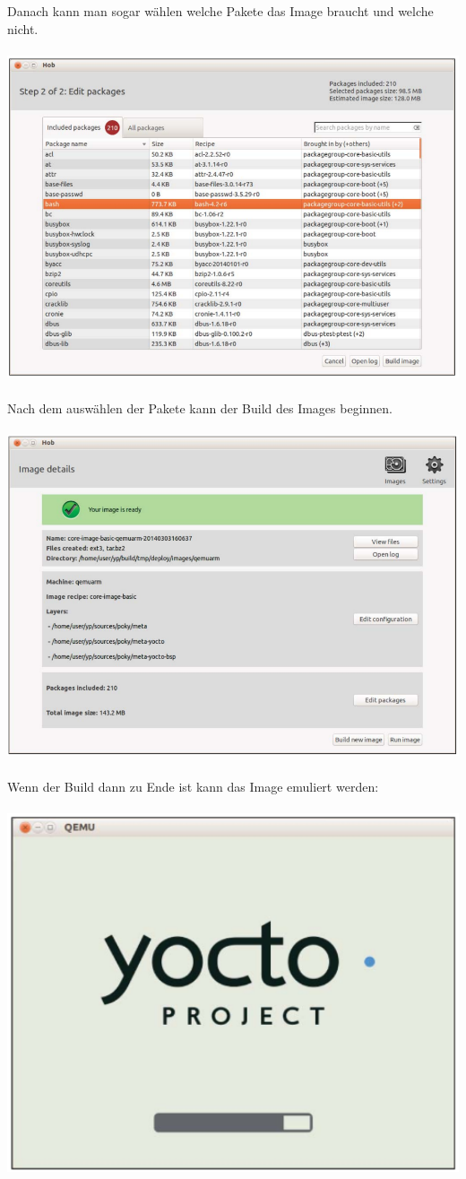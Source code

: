 \documentclass[a4paper,10pt] {article}
\begin{document}
Danach kann man sogar wählen welche Pakete das Image braucht und welche nicht.
\\\\
\includegraphics[width=1.0\textwidth]{Hob_Package_2}
\\\\
Nach dem auswählen der Pakete kann der Build des Images beginnen.
\\\\
\includegraphics[width=1.0\textwidth]{Hob_Finished}
\\\\
Wenn der Build dann zu Ende ist kann das Image emuliert werden:
\\\\
\includegraphics[width=1.0\textwidth]{Yocto_Emule}
\end{document}
